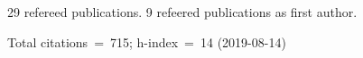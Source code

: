 29 refereed publications. 9 refeered publications as first author.

Total citations~=~715; h-index~=~14 (2019-08-14)